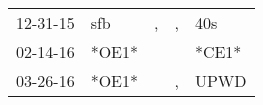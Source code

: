 \begin{supertabular}{lllll}
 12-31-15 &    sfb &  , &  , &    40s \\
 02-14-16 &  *OE1* &    &    &  *CE1* \\
 03-26-16 &  *OE1* &    &  , &   UPWD \\
\end{supertabular}
